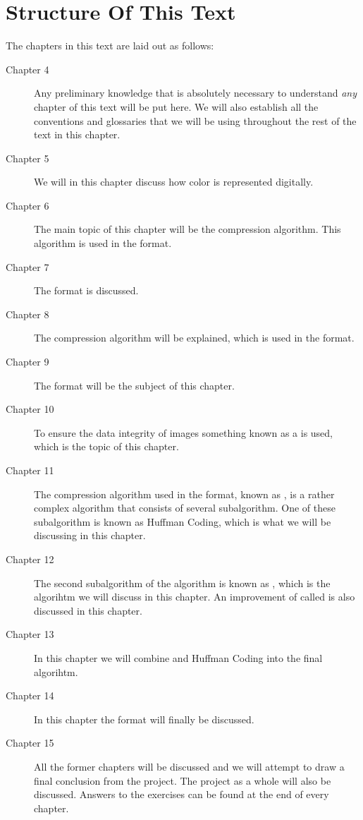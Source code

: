 \section{Structure Of This Text}

The chapters in this text are laid out as follows:

\begin{description}
\item[Chapter 4] Any preliminary knowledge that is absolutely
  necessary to understand \textit{any} chapter of this text will be
  put here. We will also establish all the conventions and glossaries
  that we will be using throughout the rest of the text in this
  chapter.

\item[Chapter 5] We will in this chapter discuss how color is
  represented digitally.

\item[Chapter 6] The main topic of this chapter will be the \rle
  compression algorithm. This algorithm is used in the \tga format.

\item[Chapter 7] The \tga format is discussed.

\item[Chapter 8] The \lzw compression algorithm will be explained,
  which is used in the \gif format.

\item[Chapter 9] The \gif format will be the subject of this chapter.

\item[Chapter 10] To ensure the data integrity of \png images something
  known as a \crc is used, which is the topic of this chapter.

\item[Chapter 11] The compression algorithm used in the \png format,
  known as , is a rather complex algorithm that consists of
  several subalgorithm. One of these subalgorithm is known as
  Huffman Coding, which is what we will be discussing in this chapter.

\item[Chapter 12] The second subalgorithm of the  algorithm is
  known as \lzone, which is the algorihtm we will discuss in this
  chapter. An improvement of \lzone called \lzss is also discussed in
  this chapter.

\item[Chapter 13] In this chapter we will combine \lzone and Huffman
  Coding into the final  algorihtm.

\item[Chapter 14] In this chapter the \png format will finally be
  discussed.

\item[Chapter 15] All the former chapters will be discussed and we
  will attempt to draw a final conclusion from the project. The
  project as a whole will also be discussed. Answers to the exercises
  can be found at the end of every chapter.

\end{description}

